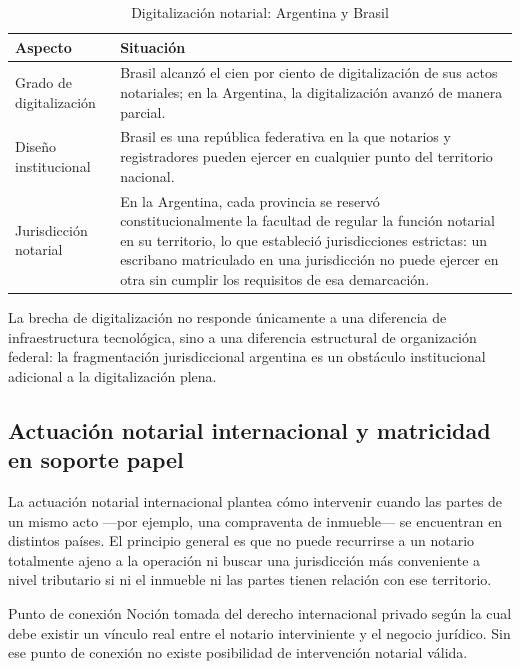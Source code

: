 \documentclass[12pt,oneside]{book}
\begin{document}
\begin{table}[H]
\centering
\caption{Digitalización notarial: Argentina y Brasil}
\renewcommand{\arraystretch}{1.2}
\begin{tabularx}{\textwidth}{>{\raggedright\arraybackslash}p{}X}
\toprule
\textbf{Aspecto} & \textbf{Situación} \\
\midrule
Grado de digitalización & Brasil alcanzó el cien por ciento de digitalización de sus actos notariales; en la Argentina, la digitalización avanzó de manera parcial. \\
Diseño institucional & Brasil es una república federativa en la que notarios y registradores pueden ejercer en cualquier punto del territorio nacional. \\
Jurisdicción notarial & En la Argentina, cada provincia se reservó constitucionalmente la facultad de regular la función notarial en su territorio, lo que estableció jurisdicciones estrictas: un escribano matriculado en una jurisdicción no puede ejercer en otra sin cumplir los requisitos de esa demarcación. \\
\bottomrule
\end{tabularx}
\end{table}

La brecha de digitalización no responde únicamente a una diferencia de infraestructura tecnológica, sino a una diferencia estructural de organización federal: la fragmentación jurisdiccional argentina es un obstáculo institucional adicional a la digitalización plena.

\subsection{Actuación notarial internacional y matricidad en soporte papel}

La actuación notarial internacional plantea cómo intervenir cuando las partes de un mismo acto ---por ejemplo, una compraventa de inmueble--- se encuentran en distintos países. El principio general es que no puede recurrirse a un notario totalmente ajeno a la operación ni buscar una jurisdicción más conveniente a nivel tributario si ni el inmueble ni las partes tienen relación con ese territorio.

\begin{definition}{Punto de conexión}
Noción tomada del derecho internacional privado según la cual debe existir un vínculo real entre el notario interviniente y el negocio jurídico. Sin ese punto de conexión no existe posibilidad de intervención notarial válida.
\end{definition}
\end{document}
